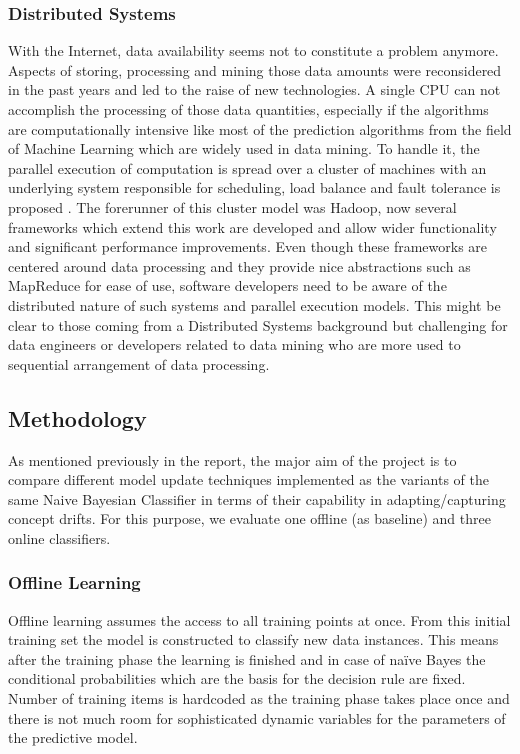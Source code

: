 \documentclass{article} %
\begin{document}
\subsubsection{Distributed Systems}
With the Internet, data availability seems not to constitute a problem anymore. Aspects of storing, processing and mining those data amounts were reconsidered in the past years and led to the raise of new technologies. A single CPU can not accomplish the processing of those data quantities, especially if the algorithms are computationally intensive like most of the prediction algorithms from the field of Machine Learning which are widely used in data mining. To handle it, the parallel execution of computation is spread over a cluster of machines with an underlying system responsible for scheduling, load balance and fault tolerance is proposed \cite[p. 10]{zaharia2010} . The forerunner of this cluster model was Hadoop, now several frameworks which extend this work are developed and allow wider functionality and significant performance improvements. Even though these frameworks are centered around data processing and they provide nice abstractions such as MapReduce for ease of use, software developers need to be aware of the distributed nature of such systems and parallel execution models. This might be clear to those coming from a Distributed Systems background but challenging for data engineers or developers related to data mining who are more used to sequential arrangement of data processing. 

\subsection{Methodology}
As mentioned previously in the report, the major aim of the project is to compare different model update techniques implemented as the variants of the same Naive Bayesian Classifier in terms of their capability in adapting/capturing concept drifts. For this purpose, we evaluate one offline (as baseline) and three online classifiers.

\subsubsection{Offline Learning}
Offline learning assumes the access to all training points at once. From this initial training set the model is constructed to classify new data instances. This means after the training phase the learning is finished and in case of na\"ive Bayes  the conditional probabilities which are the basis for the decision rule are fixed. Number of training items is hardcoded as the training phase takes place once and there is not much room for sophisticated dynamic variables for the parameters of the predictive model.
\end{document}
